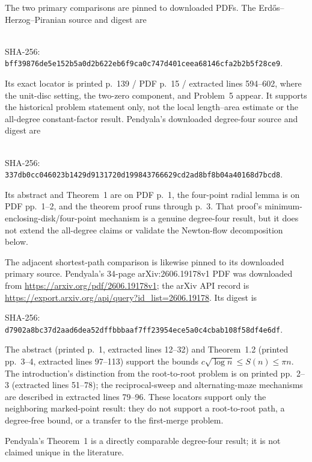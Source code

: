 The two primary comparisons are pinned to downloaded PDFs.  The
Erd\H{o}s--Herzog--Piranian source and digest are
\begin{center}
\footnotesize
{}\\
SHA-256: \nolinkurl{bff39876de5e152b5a0d2b622eb6f9ca0c747d401ceea68146cfa2b2b5f28ce9}.
\end{center}
Its exact locator is printed p.~139 / PDF p.~15 / extracted lines 594--602,
where the unit-disc setting, the two-zero component, and Problem~5 appear.
It supports the historical problem statement only, not the local length--area
estimate or the all-degree constant-factor result.  Pendyala's downloaded
degree-four source and digest are
\begin{center}
\footnotesize
{}\\
SHA-256: \nolinkurl{337db0cc046023b1429d9131720d199843766629cd2ad8bf8b04a40168d7bcd8}.
\end{center}
Its abstract and Theorem~1 are on PDF p.~1, the four-point radial lemma is on
PDF pp.~1--2, and the theorem proof runs through p.~3.  That proof's
minimum-enclosing-disk/four-point mechanism is a genuine degree-four result,
but it does not extend the all-degree claims or validate the Newton-flow
decomposition below.

The adjacent shortest-path comparison is likewise pinned to its downloaded
primary source.  Pendyala's 34-page arXiv:2606.19178v1 PDF was downloaded from
\url{https://arxiv.org/pdf/2606.19178v1}; the arXiv API record is
\url{https://export.arxiv.org/api/query?id_list=2606.19178}.  Its digest is
\begin{center}
\footnotesize
SHA-256: \nolinkurl{d7902a8bc37d2aad6dea52dffbbbaaf7ff23954ece5a0c4cbab108f58df4e6df}.
\end{center}
The abstract (printed p.~1, extracted lines 12--32) and Theorem~1.2 (printed
pp.~3--4, extracted lines 97--113) support the bounds
$c\sqrt{\log n}\leq S(n)\leq\pi n$.  The introduction's distinction from the
root-to-root problem is on printed pp.~2--3 (extracted lines 51--78); the
reciprocal-sweep and alternating-maze mechanisms are described in extracted
lines 79--96.  These locators support only the neighboring marked-point result:
they do not support a root-to-root path, a degree-free bound, or a transfer to
the first-merge problem.

Pendyala's Theorem~1 is a directly comparable degree-four result; it is not claimed unique in the literature.



